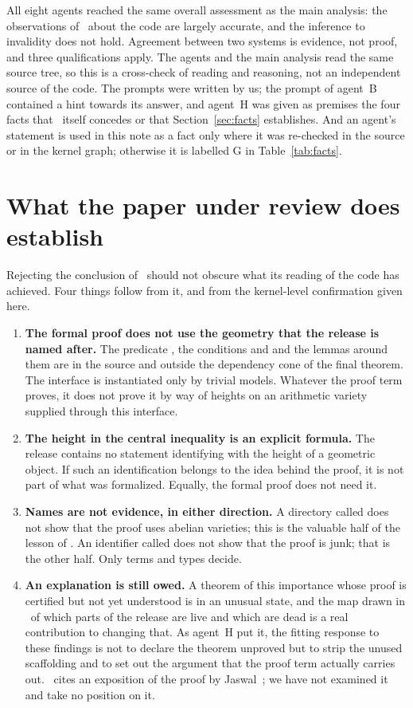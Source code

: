 All eight agents reached the same overall assessment as the main analysis: the observations of \N\ about the code are largely accurate, and the inference to invalidity does not hold.
Agreement between two systems is evidence, not proof, and three qualifications apply.
The agents and the main analysis read the same source tree, so this is a cross-check of reading and reasoning, not an independent source of the code.
The prompts were written by us; the prompt of agent~B contained a hint towards its answer, and agent~H was given as premises the four facts that \N\ itself concedes or that Section~\ref{sec:facts} establishes.
And an agent's statement is used in this note as a fact only where it was re-checked in the source or in the kernel graph; otherwise it is labelled \textsf{G} in Table~\ref{tab:facts}.

\section{What the paper under review does establish}
\label{sec:credit}

Rejecting the conclusion of \N\ should not obscure what its reading of the code has achieved. Four things follow from it, and from the kernel-level confirmation given here.

\begin{enumerate}
\item \textbf{The formal proof does not use the geometry that the release is named after.}
The predicate , the conditions  and  and the lemmas around them are in the source and outside the dependency cone of the final theorem.
The interface  is instantiated only by trivial models. Whatever the proof term proves, it does not prove it by way of heights on an arithmetic variety supplied through this interface.
\item \textbf{The height in the central inequality is an explicit formula.} The release contains no statement identifying  with the height of a geometric object.
If such an identification belongs to the idea behind the proof, it is not part of what was formalized. Equally, the formal proof does not need it.
\item \textbf{Names are not evidence, in either direction.} A directory called  does not show that the proof uses abelian varieties; this is the valuable half of the lesson of \N.
An identifier called  does not show that the proof is junk; that is the other half. Only terms and types decide.
\item \textbf{An explanation is still owed.} A theorem of this importance whose proof is certified but not yet understood is in an unusual state, and the map drawn in \N\ of which parts of the release are live and which are dead is a real contribution to changing that.
As agent~H put it, the fitting response to these findings is not to declare the theorem unproved but to strip the unused scaffolding and to set out the argument that the proof term actually carries out.
\N\ cites an exposition of the proof by Jaswal~\cite{jaswal}; we have not examined it and take no position on it.
\end{enumerate}

